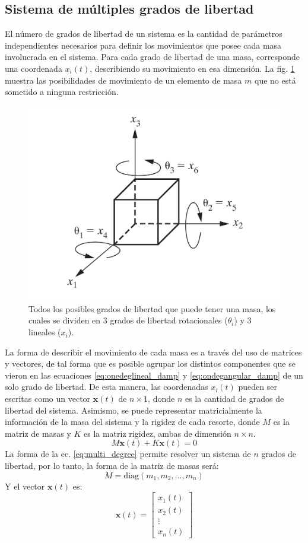 \subsection{Sistema de múltiples grados de libertad}
El número de grados de libertad de un sistema es la cantidad de parámetros independientes necesarios para definir los movimientos que posee cada masa involucrada en el sistema. Para cada grado de libertad de una masa, corresponde una coordenada $x_i(t)$, describiendo su movimiento en esa dimensión. La fig. \ref{fig:dof} muestra las posibilidades de movimiento de un elemento de masa $m$ que no está sometido a ninguna restricción.

\begin{figure}[h]
\centering
\includegraphics[width=0.5\linewidth]{Imagenes/dof.pdf}
\caption{Todos los posibles grados de libertad que puede tener una masa, los cuales se dividen en 3 grados de libertad rotacionales ($\theta_i$) y 3 lineales ($x_i$). \cite{inman2014engineering}}
\label{fig:dof}
\end{figure}

La forma de describir el movimiento de cada masa es a través del uso de matrices y vectores, de tal forma que es posible agrupar los distintos componentes que se vieron en las ecuaciones \ref{eq:onedeglineal_damp} y \ref{eq:ondegangular_damp} de un solo grado de libertad. De esta manera, las coordenadas $x_i(t)$ pueden ser escritas como un vector $\mathbf{x}(t)$ de $n \times 1$, donde $n$ es la cantidad de grados de libertad del sistema. Asimismo, se puede representar matricialmente la información de la masa del sistema y la rigidez de cada resorte, donde $\mathit{M}$ es la matriz de masas y $\mathit{K}$ es la matriz rigidez, ambas de dimensión $n \times n$. 
\begin{equation}\label{eq:multi_degree}
	\mathit{M}\mathbf{\ddot{x}}(t) + \mathit{K}\mathbf{x}(t) = 0
\end{equation}
La forma de la ec. \ref{eq:multi_degree} permite resolver un sistema de $n$ grados de libertad, por lo tanto, la forma de la matriz de masas será:
\begin{equation*}
	\mathit{M}=\text{diag}(m_1,m_2,...,m_n)
\end{equation*}
Y el vector $\mathbf{x}(t)$ es:
\begin{equation*}
	\mathbf{x}(t) = \begin{bmatrix}
	x_1(t)\\
	x_2(t)\\
	\vdots\\
	x_n(t)
	\end{bmatrix}
\end{equation*} 


